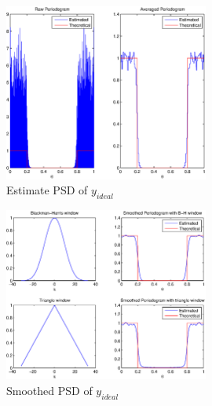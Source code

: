 \documentclass[10pt]{article}
\begin{document}
\begin{figure}[!hp]

    \begin{center}
      \includegraphics[width=0.6\textwidth]{BPeriodogram}
    \caption{Estimate PSD of $y_{ideal}$ \label{fig:BPSDest}}
    \end{center}

\end{figure}

\begin{figure}[!hp]

    \begin{center}
      \includegraphics[width=0.6\textwidth]{BSmoothed}
    \caption{Smoothed PSD of $y_{ideal}$ \label{fig:BPSDSmooth}}
    \end{center}

\end{figure}

\clearpage
\end{document}
